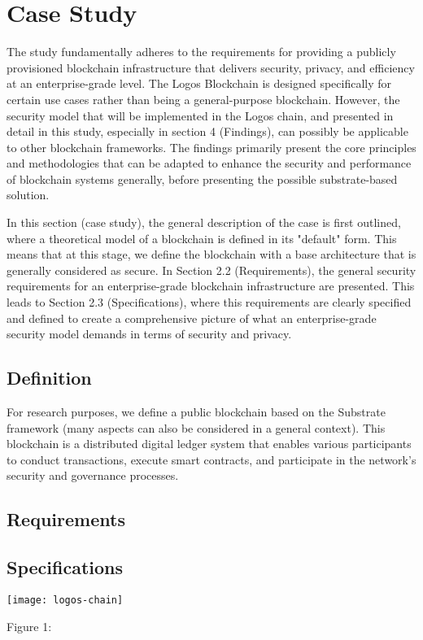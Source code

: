 \section{Case Study}
The study fundamentally adheres to the requirements for providing a publicly provisioned blockchain infrastructure that delivers security, privacy, and efficiency at an enterprise-grade level. The Logos Blockchain is designed specifically for certain use cases rather than being a general-purpose blockchain. However, the security model that will be implemented in the Logos chain, and presented in detail in this study, especially in section 4 (Findings), can possibly be applicable to other blockchain frameworks. The findings primarily present the core principles and methodologies that can be adapted to enhance the security and performance of blockchain systems generally, before presenting the possible substrate-based solution. 

In this section (case study), the general description of the case is first outlined, where a theoretical model of a blockchain is defined in its "default" form. This means that at this stage, we define the blockchain with a base architecture that is generally considered as secure. In Section 2.2 (Requirements), the general security requirements for an enterprise-grade blockchain infrastructure are presented. This leads to Section 2.3 (Specifications), where this requirements are clearly specified and defined to create a comprehensive picture of what an enterprise-grade security model demands in terms of security and privacy.

\subsection{Definition}
For research purposes, we define a public blockchain based on the Substrate framework (many aspects can also be considered in a general context). This blockchain is a distributed digital ledger system that enables various participants to conduct transactions, execute smart contracts, and participate in the network's security and governance processes.


\subsection{Requirements}


\subsection{Specifications}

\begin{center}
	\texttt{[image: logos-chain]}
\end{center}
\begin{center}
	Figure 1: 
\end{center}